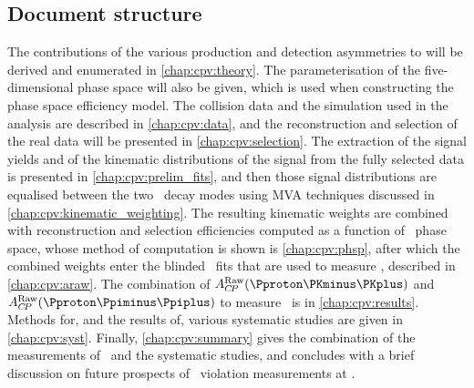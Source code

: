 \subsection{Document structure}
\label{chap:cpv:introduction:overview:structure}

The contributions of the various production and detection asymmetries to \ARaw 
will be derived and enumerated in \cref{chap:cpv:theory}.
The parameterisation of the five-dimensional phase space will also be given, 
which is used when constructing the phase space efficiency model.
The collision data and the simulation used in the analysis are described in 
\cref{chap:cpv:data}, and the reconstruction and selection of the real data 
will be presented in \cref{chap:cpv:selection}.
The extraction of the signal yields and of the kinematic distributions of the 
signal from the fully selected data is presented in 
\cref{chap:cpv:prelim_fits}, and then those signal distributions are equalised 
between the two \PLambdac\ decay modes using \ac{MVA} techniques discussed in 
\cref{chap:cpv:kinematic_weighting}.
The resulting kinematic weights are combined with reconstruction and selection 
efficiencies computed as a function of \phh\ phase space, whose method of 
computation is shown is \cref{chap:cpv:phsp}, after which the combined weights 
enter the blinded \chisq\ fits that are used to measure \ARaw, described in 
\cref{chap:cpv:araw}.
The combination of $\ARaw(\pKK)$ and $\ARaw(\ppipi)$ to measure \dACP\ is in 
\cref{chap:cpv:results}.
Methods for, and the results of, various systematic studies are given in 
\cref{chap:cpv:syst}.
Finally, \cref{chap:cpv:summary} gives the combination of the measurements of 
\dACP\ and the systematic studies, and concludes with a brief discussion on 
future prospects of \CP\ violation measurements at \lhcb.

